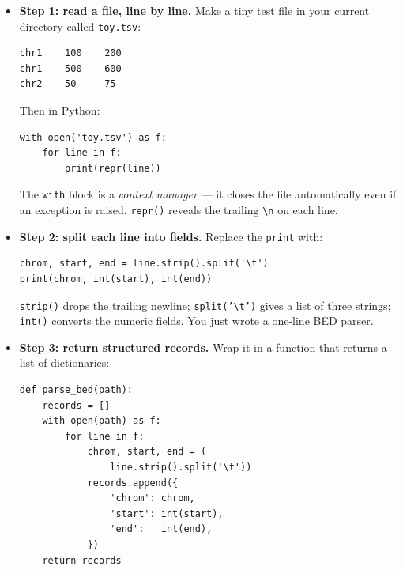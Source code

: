 \begin{itemize}[nosep]
  \item \textbf{Step 1: read a file, line by line.} Make a tiny test file in your current directory called \texttt{toy.tsv}:
    \begin{lstlisting}
chr1    100    200
chr1    500    600
chr2    50     75
    \end{lstlisting}
    Then in Python:
    \begin{lstlisting}
with open('toy.tsv') as f:
    for line in f:
        print(repr(line))
    \end{lstlisting}
    The \texttt{with} block is a \textit{context manager} --- it closes the file automatically even if an exception is raised. \texttt{repr()} reveals the trailing \texttt{\textbackslash n} on each line.
  \item \textbf{Step 2: split each line into fields.} Replace the \texttt{print} with:
    \begin{lstlisting}
chrom, start, end = line.strip().split('\t')
print(chrom, int(start), int(end))
    \end{lstlisting}
    \texttt{strip()} drops the trailing newline; \texttt{split('\textbackslash t')} gives a list of three strings; \texttt{int()} converts the numeric fields. You just wrote a one-line BED parser.
  \item \textbf{Step 3: return structured records.} Wrap it in a function that returns a list of dictionaries:
    \begin{lstlisting}
def parse_bed(path):
    records = []
    with open(path) as f:
        for line in f:
            chrom, start, end = (
                line.strip().split('\t'))
            records.append({
                'chrom': chrom,
                'start': int(start),
                'end':   int(end),
            })
    return records


\end{lstlisting}
\end{itemize}
